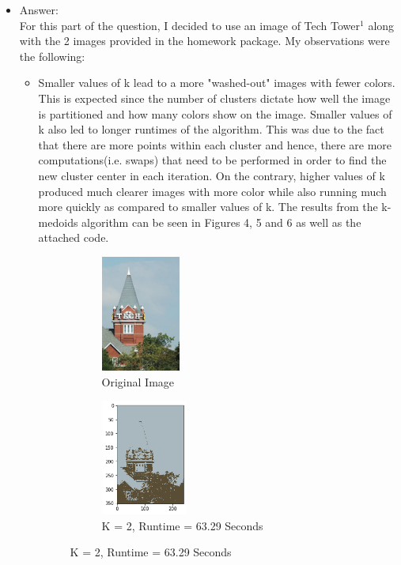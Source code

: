 \documentclass[twoside,10pt]{article}
\begin{document}
\begin{enumerate}
  \begin{itemize}
  \item Answer:\\
  For this part of the question, I decided to use an image of Tech Tower$^1$ along with the 2 images provided in the homework package. My observations were the following:
  \begin{itemize}
  \item Smaller values of k lead to a more "washed-out" images with fewer colors. This is expected since the number of clusters dictate how well the image is partitioned and how many colors show on the image. Smaller values of k also led to longer runtimes of the algorithm. This was due to the fact that there are more points within each cluster and hence, there are more computations(i.e. swaps) that need to be performed in order to find the new cluster center in each iteration. On the contrary, higher values of k produced much clearer images with more color while also running much more quickly as compared to smaller values of k. The results from the k-medoids algorithm can be seen in Figures 4, 5 and 6 as well as the attached code.
  
  
\begin{figure}
\begin{subfigure}{.5\textwidth}
  \centering
  \includegraphics[height=1.5in]{Images/TechTower.jpg}  
  \caption{Original Image}
  \label{fig:sub-first}
\end{subfigure}
\begin{subfigure}{.5\textwidth}
  \centering
  \includegraphics[height=1.5in]{Images/TechTowerKMedoids2.png}  
  \caption{K = 2, Runtime = 63.29 Seconds}
  \label{fig:sub-second}
\end{subfigure}


\end{figure}
\end{itemize}
\end{itemize}
\end{enumerate}
\end{document}
